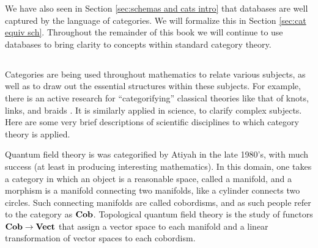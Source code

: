 \documentclass[CT4S-EN-RU]{subfiles}
\begin{document}
\begin{blockENG}
We have also seen in Section \ref{sec:schemas and cats intro} that databases are well captured by the language of categories. We will formalize this in Section \ref{sec:cat equiv sch}. Throughout the remainder of this book we will continue to use databases to bring clarity to concepts within standard category theory. 
\end{blockENG}

\begin{blockRUS}
\end{blockRUS}


\subsection{} 

\begin{blockENG}
Categories are being used throughout mathematics to relate various subjects, as well as to draw out the essential structures within these subjects. For example, there is an active research for “categorifying” classical theories like that of knots, links, and braids \cite{Kho}. It is similarly applied in science, to clarify complex subjects. Here are some very brief descriptions of scientific disciplines to which category theory is applied.
\end{blockENG}

\begin{blockRUS}
\end{blockRUS}

\begin{blockENG}
Quantum field theory is was categorified by Atiyah \cite{Ati} in the late 1980's, with much success (at least in producing interesting mathematics). In this domain, one takes a category in which an object is a reasonable space, called a manifold, and a morphism is a manifold connecting two manifolds, like a cylinder connects two circles. Such connecting manifolds are called cobordisms, and as such people refer to the category as ${\mathbf{Cob}}$. Topological quantum field theory is the study of functors ${\mathbf{Cob}}\rightarrow{\mathbf{Vect}}$ that assign a vector space to each manifold and a linear transformation of vector spaces to each cobordism. 
\end{blockENG}

\begin{blockRUS}
\end{blockRUS}
\end{document}
